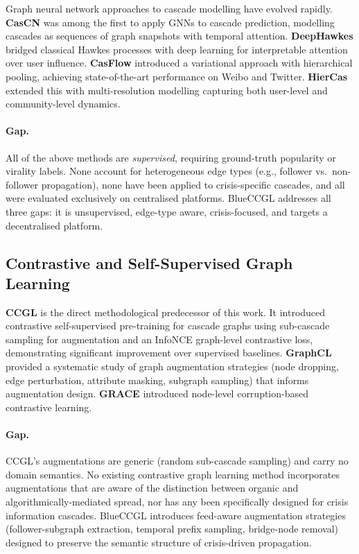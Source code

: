 \documentclass[12pt,a4paper]{article}
\begin{document}
Graph neural network approaches to cascade modelling have evolved rapidly.
\textbf{CasCN} \citep{chen2019cascn} was among the first to apply GNNs to
cascade prediction, modelling cascades as sequences of graph snapshots with
temporal attention.  \textbf{DeepHawkes} \citep{cao2017deephawkes} bridged
classical Hawkes processes with deep learning for interpretable attention over
user influence.  \textbf{CasFlow} \citep{yuan2024casflow} introduced a
variational approach with hierarchical pooling, achieving state-of-the-art
performance on Weibo and Twitter.  \textbf{HierCas} \citep{zhang2024hiercas}
extended this with multi-resolution modelling capturing both user-level and
community-level dynamics.

\paragraph{Gap.}
All of the above methods are \emph{supervised}, requiring ground-truth
popularity or virality labels.  None account for heterogeneous edge types
(e.g., follower vs.\ non-follower propagation), none have been applied to
crisis-specific cascades, and all were evaluated exclusively on centralised
platforms.  BlueCCGL addresses all three gaps: it is unsupervised, edge-type
aware, crisis-focused, and targets a decentralised platform.

\subsection{Contrastive and Self-Supervised Graph Learning}

\textbf{CCGL} \citep{xu2022ccgl} is the direct methodological predecessor of
this work.  It introduced contrastive self-supervised pre-training for cascade
graphs using sub-cascade sampling for augmentation and an InfoNCE graph-level
contrastive loss, demonstrating significant improvement over supervised
baselines.  \textbf{GraphCL} \citep{you2020graphcl} provided a systematic study
of graph augmentation strategies (node dropping, edge perturbation, attribute
masking, subgraph sampling) that informs augmentation design.  \textbf{GRACE}
\citep{zhu2020grace} introduced node-level corruption-based contrastive
learning.

\paragraph{Gap.}
CCGL's augmentations are generic (random sub-cascade sampling) and carry no
domain semantics.  No existing contrastive graph learning method incorporates
augmentations that are aware of the distinction between organic and
algorithmically-mediated spread, nor has any been specifically designed for
crisis information cascades.  BlueCCGL introduces feed-aware augmentation
strategies (follower-subgraph extraction, temporal prefix sampling, bridge-node
removal) designed to preserve the semantic structure of crisis-driven
propagation.
\end{document}
